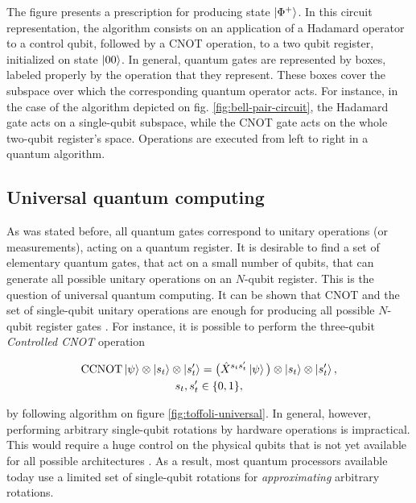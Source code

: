     

    The figure presents a prescription for producing state $\ket{\Phi^{+}}$. In this circuit representation, the algorithm consists on an application of a Hadamard operator to a control qubit, followed by a CNOT operation, to a two qubit register, initialized on state $\ket{00}$. In general, quantum gates are represented by boxes, labeled properly by the operation that they represent. These boxes cover the subspace over which the corresponding quantum operator acts. For instance, in the case of the algorithm depicted on fig. \ref{fig:bell-pair-circuit}, the Hadamard gate acts on a single-qubit subspace, while the CNOT gate acts on the whole two-qubit register's space. Operations are executed from left to right in a quantum algorithm.

  \subsection{Universal quantum computing}
  \label{subsec:UniversalQC}
    
    As was stated before, all quantum gates correspond to unitary operations (or measurements), acting on a quantum register. It is desirable to find a set of elementary quantum gates, that act on a small number of qubits, that can generate all possible unitary operations on an $N$-qubit register. This is the question of universal quantum computing. It can be shown that CNOT and the set of single-qubit unitary operations are enough for producing all possible $N$-qubit register gates \cite{Nielsen}. For instance, it is possible to perform the three-qubit \textit{Controlled CNOT} operation

    \begin{gather}
      \text{CCNOT} \ket{\psi} \otimes \ket{s_t} \otimes \ket{s'_t} = \big(\hat{X}^{s_t s'_t} \ket{\psi}\big) \otimes \ket{s_t} \otimes \ket{s'_t}, \\
      s_t, s'_t \in \{0,1\},
      \label{eq:toffoli-definition}
    \end{gather}

    \noindent by following algorithm on figure \ref{fig:toffoli-universal}. In general, however, performing arbitrary single-qubit rotations by hardware operations is impractical. This would require a huge control on the physical qubits that is not yet available for all possible architectures \cite{Nielsen}. As a result, most quantum processors available today use a limited set of single-qubit rotations for \textit{approximating} arbitrary rotations.

